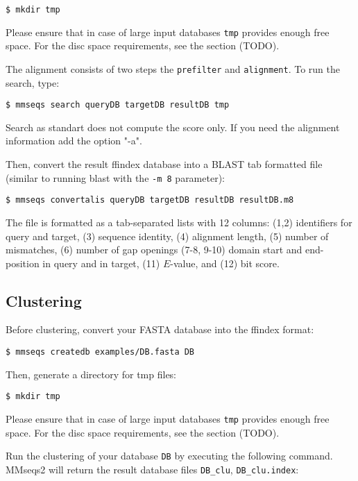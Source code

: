 \documentclass[11pt,a4paper]{scrreprt}
\begin{document}
\begin{verbatim}
$ mkdir tmp
\end{verbatim}

Please ensure that in case of large input databases \texttt{tmp} provides enough free space. For the disc space requirements, see the section (TODO).

The alignment consists of two steps the \texttt{prefilter} and \texttt{alignment}. To run the search, type:

\begin{verbatim}
$ mmseqs search queryDB targetDB resultDB tmp
\end{verbatim}
Search as standart does not compute the score only. If you need the alignment information add the option "-a". 

Then, convert the result ffindex database into a BLAST tab formatted file (similar to running blast with the \texttt{-m 8} parameter):

\begin{verbatim}
$ mmseqs convertalis queryDB targetDB resultDB resultDB.m8
\end{verbatim}

The file is formatted as a tab-separated lists with 12 columns: (1,2) identifiers for query and target, (3) sequence identity, (4) alignment length, (5) number of mismatches, (6) number of gap openings (7-8, 9-10) domain start and end-position in query and in target, (11) $E$-value, and (12) bit score.
\subsection*{Clustering}
Before clustering, convert your FASTA database into the ffindex format:

\begin{verbatim}
$ mmseqs createdb examples/DB.fasta DB
\end{verbatim}

Then, generate a directory for tmp files:

\begin{verbatim}
$ mkdir tmp
\end{verbatim}

Please ensure that in case of large input databases \texttt{tmp} provides enough free space. For the disc space requirements, see the section (TODO).

Run the clustering of your database \texttt{DB} by executing the following command. MMseqs2 will return the result database files \texttt{DB\_clu}, \texttt{DB\_clu.index}:
\end{document}
